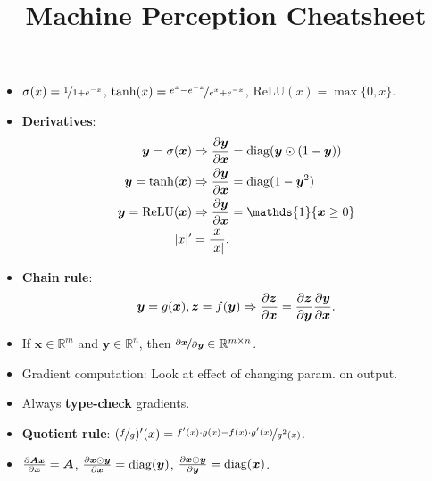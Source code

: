 \documentclass{article}
\title{Machine Perception Cheatsheet}
\newcommand{\R}{\mathbb{R}}
\renewcommand{\vec}[1]{\bm{#1}}
\newcommand{\mat}[1]{\bm{#1}}
\begin{document}
\setlength{\columnsep}{0.15cm}


\begin{multicols*}{2}

    \begin{itemize}
        \item $\sigma(x) = \nicefrac{1}{1 + e^{-x}}$, $\tanh(x) = \nicefrac{e^x - e^{-x}}{e^x + e^{-x}}$, $\mathrm{ReLU}(x) = \max\{ 0,x \}$.
        \item \textbf{Derivatives}:
              \begin{align*}
                  \vec{y} = \sigma(\vec{x})        & \Rightarrow \pdv{\vec{y}}{\vec{x}} = \mathrm{diag}(\vec{y} \odot (1 - \vec{y})) \\
                  \vec{y} = \tanh(\vec{x})         & \Rightarrow \pdv{\vec{y}}{\vec{x}} = \mathrm{diag}(1 - \vec{y}^2)               \\
                  \vec{y} = \mathrm{ReLU}(\vec{x}) & \Rightarrow \pdv{\vec{y}}{\vec{x}} = \mathds{1}\{ \vec{x} \geq 0 \}             \\
                  |x|'                             & = \frac{x}{|x|}.
              \end{align*}

        \item \textbf{Chain rule}: \[
                  \vec{y} = g(\vec{x}), \vec{z} = f(\vec{y}) \Rightarrow \pdv{\vec{z}}{\vec{x}} = \pdv{\vec{z}}{\vec{y}} \pdv{\vec{y}}{\vec{x}}.
              \]

        \item If $\vec{x} \in \R^{m}$ and $\vec{y} \in \R^{n}$, then $\nicefrac{\partial \vec{x}}{\partial
                      \vec{y}} \in \R^{m\times n}$.
        \item Gradient computation: Look at effect of changing param. on output.
        \item Always \textbf{type-check} gradients.
        \item \textbf{Quotient rule}: $(\nicefrac{f}{g})'(x) = \nicefrac{f'(x)\cdot g(x) - f(x)\cdot g'(x)}{g^2(x)}$.
        \item $\pdv{\mat{A} \vec{x}}{\vec{x}} = \mat{A}$, $\pdv{\vec{x} \odot \vec{y}}{\vec{x}} = \mathrm{diag}(\vec{y})$, $\pdv{\vec{x} \odot \vec{y}}{\vec{y}} = \mathrm{diag}(\vec{x})$.


\end{itemize}
\end{multicols*}
\end{document}
